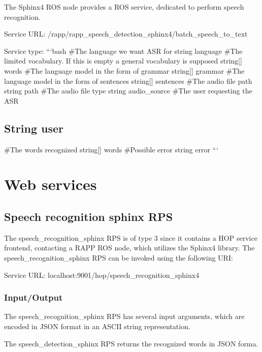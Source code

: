 The Sphinx4 R\-O\-S node provides a R\-O\-S service, dedicated to perform speech recognition.

Service U\-R\-L\-: {\ttfamily /rapp/rapp\-\_\-speech\-\_\-detection\-\_\-sphinx4/batch\-\_\-speech\-\_\-to\-\_\-text}

Service type\-: ```bash \#\-The language we want A\-S\-R for string language \#\-The limited vocabulary. If this is empty a general vocabulary is supposed string\mbox{[}\mbox{]} words \#\-The language model in the form of grammar string\mbox{[}\mbox{]} grammar \#\-The language model in the form of sentences string\mbox{[}\mbox{]} sentences \#\-The audio file path string path \#\-The audio file type string audio\-\_\-source \#\-The user requesting the A\-S\-R \subsection*{String user }

\#\-The words recognized string\mbox{[}\mbox{]} words \#\-Possible error string error ```

\section*{Web services}

\subsection*{Speech recognition sphinx R\-P\-S}

The speech\-\_\-recognition\-\_\-sphinx R\-P\-S is of type 3 since it contains a H\-O\-P service frontend, contacting a R\-A\-P\-P R\-O\-S node, which utilizes the Sphinx4 library. The speech\-\_\-recognition\-\_\-sphinx R\-P\-S can be invoked using the following U\-R\-I\-:

Service U\-R\-L\-: {\ttfamily localhost\-:9001/hop/speech\-\_\-recognition\-\_\-sphinx4}

\subsubsection*{Input/\-Output}

The speech\-\_\-recognition\-\_\-sphinx R\-P\-S has several input arguments, which are encoded in J\-S\-O\-N format in an A\-S\-C\-I\-I string representation.

The speech\-\_\-detection\-\_\-sphinx R\-P\-S returns the recognized words in J\-S\-O\-N forma.

